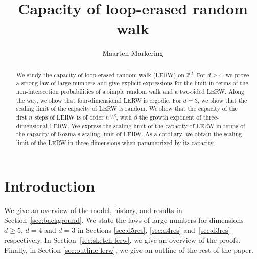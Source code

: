 \documentclass{article}
\newcommand{\1}{\mathbf{1}}
\theoremstyle{definition}
\numberwithin{equation}{section}
\numberwithin{theorem}{section}
\begin{document}
\title{Capacity of loop-erased random walk}
\date{\vspace{-5ex}}
\author{Maarten Markering}
\maketitle
\let\thefootnote\relax{}
\let\thefootnote\relax{}
\let\thefootnote\relax{}
\let\thefootnote\relax{}
\newcommand{\thefootnote}{\arabic{footnote}}

\begin{abstract}
We study the capacity of loop-erased random walk (LERW) on $\mathbb{Z}^d$. For $d\geq4$, we prove a strong law of large numbers and give explicit expressions for the limit in terms of the non-intersection probabilities of a simple random walk and a two-sided LERW. Along the way, we show that four-dimensional LERW is ergodic. For $d=3$, we show that the scaling limit of the capacity of LERW is random. We show that the capacity of the first $n$ steps of LERW is of order $n^{1/\beta}$, with $\beta$ the growth exponent of three-dimensional LERW. We express the scaling limit of the capacity of LERW in terms of the capacity of Kozma's scaling limit of LERW. As a corollary, we obtain the scaling limit of the LERW in three dimensions when parametrized by its capacity.
\end{abstract}

\section{Introduction}\label{sec:intro}
We give an overview of the model, history, and results in Section~\ref{sec:background}. We state the laws of large numbers for dimensions $d\geq5$, $d=4$ and $d=3$ in Sections \ref{sec:d5res}, \ref{sec:d4res} and~\ref{sec:d3res} respectively. In Section~\ref{sec:sketch-lerw}, we give an overview of the proofs. Finally, in Section \ref{sec:outline-lerw}, we give an outline of the rest of the paper.
\end{document}
